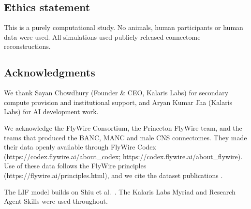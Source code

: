 \documentclass[11pt]{article}
\begin{document}
\subsection{Ethics statement}\label{ethics-statement}

This is a purely computational study. No animals, human participants or human data were used. All simulations used publicly released connectome reconstructions.

\subsection{Acknowledgments}\label{acknowledgments}

We thank Sayan Chowdhury (Founder \& CEO, Kalaris Labs) for secondary compute provision and institutional support, and Aryan Kumar Jha (Kalaris Labs) for AI development work.

We acknowledge the FlyWire Consortium, the Princeton FlyWire team, and the teams that produced the BANC, MANC and male CNS connectomes. They made their data openly available through FlyWire Codex (https://codex.flywire.ai/about\_codex; https://codex.flywire.ai/about\_flywire). Use of these data follows the FlyWire principles (https://flywire.ai/principles.html), and we cite the dataset publications \cite{dorkenwald2024,schlegel2024,bates2026,takemura2024,marin2024,berg2026}.

The LIF model builds on Shiu et al.~\cite{shiu2024}. The Kalaris Labs Myriad and Research Agent Skills were used throughout.
\end{document}
